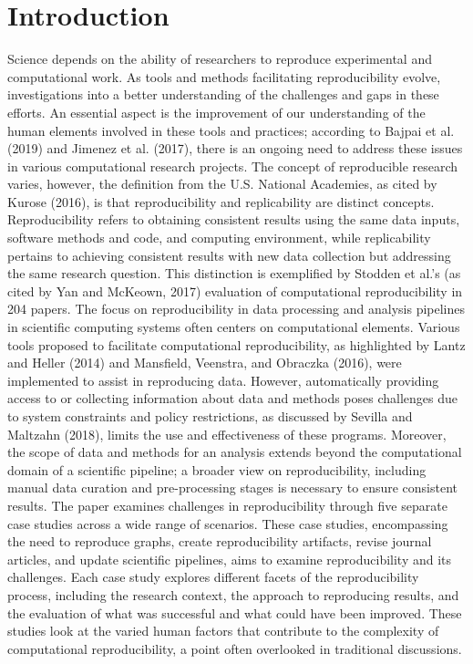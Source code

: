 \documentclass{article}
\begin{document}
\section{Introduction}
Science depends on the ability of researchers to reproduce experimental and computational work. As tools
and methods facilitating reproducibility evolve, investigations into a better understanding of the challenges and gaps
in these efforts. An essential aspect is the improvement of our understanding of the human elements involved in
these tools and practices; according to Bajpai et al. (2019) and Jimenez et al. (2017), there is an ongoing need to
address these issues in various computational research projects. The concept of reproducible research varies,
however, the definition from the U.S. National Academies, as cited by Kurose (2016), is that reproducibility and
replicability are distinct concepts. Reproducibility refers to obtaining consistent results using the same data inputs,
software methods and code, and computing environment, while replicability pertains to achieving consistent results
with new data collection but addressing the same research question. This distinction is exemplified by Stodden et
al.'s (as cited by Yan and McKeown, 2017) evaluation of computational reproducibility in 204 papers.
The focus on reproducibility in data processing and analysis pipelines in scientific computing systems often
centers on computational elements. Various tools proposed to facilitate computational reproducibility, as highlighted
by Lantz and Heller (2014) and Mansfield, Veenstra, and Obraczka (2016), were implemented to assist in
reproducing data. However, automatically providing access to or collecting information about data and methods
poses challenges due to system constraints and policy restrictions, as discussed by Sevilla and Maltzahn (2018),
limits the use and effectiveness of these programs. Moreover, the scope of data and methods for an analysis extends
beyond the computational domain of a scientific pipeline; a broader view on reproducibility, including manual data
curation and pre-processing stages is necessary to ensure consistent results.
The paper examines challenges in reproducibility through five separate case studies across a wide range of
scenarios. These case studies, encompassing the need to reproduce graphs, create reproducibility artifacts, revise
journal articles, and update scientific pipelines, aims to examine reproducibility and its challenges. Each case study
explores different facets of the reproducibility process, including the research context, the approach to reproducing
results, and the evaluation of what was successful and what could have been improved. These studies look at the
varied human factors that contribute to the complexity of computational reproducibility, a point often overlooked in
traditional discussions.
\end{document}
